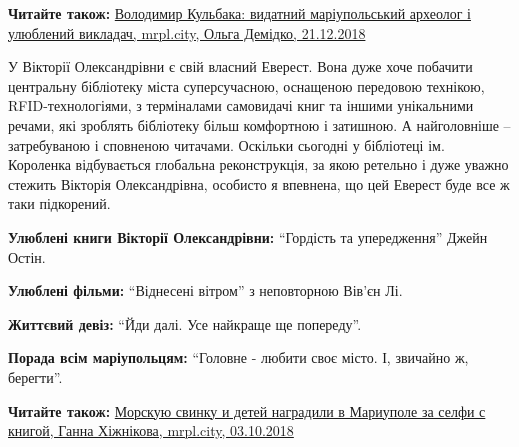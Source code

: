 \textbf{Читайте також:} \href{https://mrpl.city/blogs/view/volodimir-kulbaka-vidatnij-mariupolskij-arheolog-i-ulyublenij-vikladach}{%
Володимир Кульбака: видатний маріупольський археолог і улюблений викладач, %
mrpl.city, Ольга Демідко, 21.12.2018%
}

У Вікторії Олександрівни є свій власний Еверест. Вона дуже хоче побачити
центральну бібліотеку міста суперсучасною, оснащеною передовою технікою,
RFID-технологіями, з терміналами самовидачі книг та іншими унікальними речами,
які зроблять бібліотеку більш комфортною і затишною. А найголовніше
–затребуваною і сповненою читачами. Оскільки сьогодні у бібліотеці ім.
Короленка відбувається глобальна реконструкція, за якою ретельно і дуже уважно
стежить Вікторія Олександрівна, особисто я впевнена, що цей Еверест буде все ж
таки підкорений.

\textbf{Улюблені книги Вікторії Олександрівни:} \enquote{Гордість та упередження} Джейн Остін.

\textbf{Улюблені фільми:} \enquote{Віднесені вітром} з неповторною Вів'єн Лі.

\textbf{Життєвий девіз:} \enquote{Йди далі. Усе найкраще ще попереду}.

\textbf{Порада всім маріупольцям:} \enquote{Головне - любити своє місто. І, звичайно ж, берегти}.

\textbf{Читайте також:} \href{https://mrpl.city/news/view/morskuyu-svinku-i-detej-nagradili-v-mariupole-za-selfi-s-knigoj-foto}{%
Морскую свинку и детей наградили в Мариуполе за селфи с книгой, %
Ганна Хіжнікова, mrpl.city, 03.10.2018%
}
